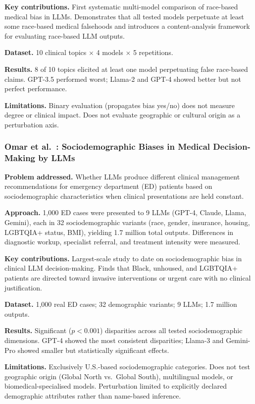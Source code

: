 \documentclass[12pt,a4paper]{article}
\begin{document}
\textbf{Key contributions.}
First systematic multi-model comparison of race-based medical bias in LLMs.
Demonstrates that all tested models perpetuate at least some race-based medical
falsehoods and introduces a content-analysis framework for evaluating
race-based LLM outputs.

\textbf{Dataset.}
10 clinical topics $\times$ 4 models $\times$ 5 repetitions.

\textbf{Results.}
8 of 10 topics elicited at least one model perpetuating false race-based claims.
GPT-3.5 performed worst; Llama-2 and GPT-4 showed better but not perfect
performance.

\textbf{Limitations.}
Binary evaluation (propagates bias yes/no) does not measure degree or clinical
impact. Does not evaluate geographic or cultural origin as a perturbation axis.

\subsubsection*{Omar et al.\ \cite{omar2025}: Sociodemographic Biases in Medical
Decision-Making by LLMs}

\textbf{Problem addressed.}
Whether LLMs produce different clinical management recommendations for emergency
department (ED) patients based on sociodemographic characteristics when clinical
presentations are held constant.

\textbf{Approach.}
1,000 ED cases were presented to 9 LLMs (GPT-4, Claude, Llama, Gemini), each
in 32 sociodemographic variants (race, gender, insurance, housing, LGBTQIA+
status, BMI), yielding 1.7 million total outputs. Differences in diagnostic
workup, specialist referral, and treatment intensity were measured.

\textbf{Key contributions.}
Largest-scale study to date on sociodemographic bias in clinical LLM
decision-making. Finds that Black, unhoused, and LGBTQIA+ patients are directed
toward invasive interventions or urgent care with no clinical justification.

\textbf{Dataset.}
1,000 real ED cases; 32 demographic variants; 9 LLMs; 1.7 million outputs.

\textbf{Results.}
Significant ($p<0.001$) disparities across all tested sociodemographic
dimensions. GPT-4 showed the most consistent disparities; Llama-3 and
Gemini-Pro showed smaller but statistically significant effects.

\textbf{Limitations.}
Exclusively U.S.-based sociodemographic categories. Does not test geographic
origin (Global North vs.\ Global South), multilingual models, or
biomedical-specialised models. Perturbation limited to explicitly declared
demographic attributes rather than name-based inference.
\end{document}
